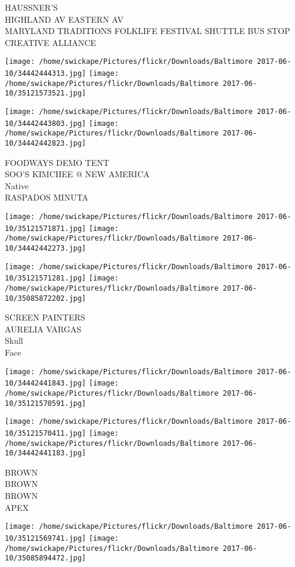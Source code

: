 \documentclass[10pt,letterpaper]{article}
\begin{document}
HAUSSNER'S\\
HIGHLAND AV EASTERN AV\\
MARYLAND TRADITIONS FOLKLIFE FESTIVAL SHUTTLE BUS STOP CREATIVE ALLIANCE
\pagebreak

\texttt{[image: /home/swickape/Pictures/flickr/Downloads/Baltimore 2017-06-10/34442444313.jpg]}
\texttt{[image: /home/swickape/Pictures/flickr/Downloads/Baltimore 2017-06-10/35121573521.jpg]}

\texttt{[image: /home/swickape/Pictures/flickr/Downloads/Baltimore 2017-06-10/34442443803.jpg]}
\texttt{[image: /home/swickape/Pictures/flickr/Downloads/Baltimore 2017-06-10/34442442823.jpg]}

FOODWAYS DEMO TENT\\
SOO'S KIMCHEE @ NEW AMERICA\\
Native\\
RASPADOS MINUTA
\pagebreak

\texttt{[image: /home/swickape/Pictures/flickr/Downloads/Baltimore 2017-06-10/35121571871.jpg]}
\texttt{[image: /home/swickape/Pictures/flickr/Downloads/Baltimore 2017-06-10/34442442273.jpg]}

\texttt{[image: /home/swickape/Pictures/flickr/Downloads/Baltimore 2017-06-10/35121571281.jpg]}
\texttt{[image: /home/swickape/Pictures/flickr/Downloads/Baltimore 2017-06-10/35085872202.jpg]}

SCREEN PAINTERS\\
AURELIA VARGAS\\
Skull\\
Face
\pagebreak

\texttt{[image: /home/swickape/Pictures/flickr/Downloads/Baltimore 2017-06-10/34442441843.jpg]}
\texttt{[image: /home/swickape/Pictures/flickr/Downloads/Baltimore 2017-06-10/35121570591.jpg]}

\texttt{[image: /home/swickape/Pictures/flickr/Downloads/Baltimore 2017-06-10/35121570411.jpg]}
\texttt{[image: /home/swickape/Pictures/flickr/Downloads/Baltimore 2017-06-10/34442441183.jpg]}

BROWN\\
BROWN\\
BROWN\\
APEX
\pagebreak

\texttt{[image: /home/swickape/Pictures/flickr/Downloads/Baltimore 2017-06-10/35121569741.jpg]}
\texttt{[image: /home/swickape/Pictures/flickr/Downloads/Baltimore 2017-06-10/35085894472.jpg]}
\end{document}
